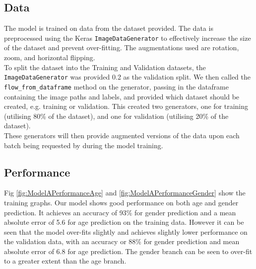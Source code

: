 \subsection{Data}
The model is trained on data from the dataset provided. The data is preprocessed using the Keras \verb|ImageDataGenerator| to effectively increase the size of the dataset and prevent over-fitting. 
The augmentations used are rotation, zoom, and horizontal flipping.\\
To split the dataset into the Training and Validation datasets, the \verb|ImageDataGenerator| was provided 0.2 as the validation split. We then called the \verb|flow_from_dataframe| method on the generator, passing in the dataframe containing the image paths and labels, and provided which dataset should be created, e.g. training or validation.
This created two generators, one for training (utilising 80\% of the dataset), and one for validation (utilising 20\% of the dataset).\\
These generators will then provide augmented versions of the data upon each batch being requested by during the model training.

\subsection{Performance}
Fig \autoref{fig:ModelAPerformanceAge} and \autoref{fig:ModelAPerformanceGender} show the training graphs. 
Our model shows good performance on both age and gender prediction. 
It achieves an accuracy of 93\% for gender prediction and a mean absolute error of 5.6 for age prediction on the training data. 
However it can be seen that the model over-fits slightly and achieves slightly lower performance on the validation data, with an accuracy or 88\% for gender prediction and mean absolute error of 6.8 for age prediction. 
The gender branch can be seen to over-fit to a greater extent than the age branch.

